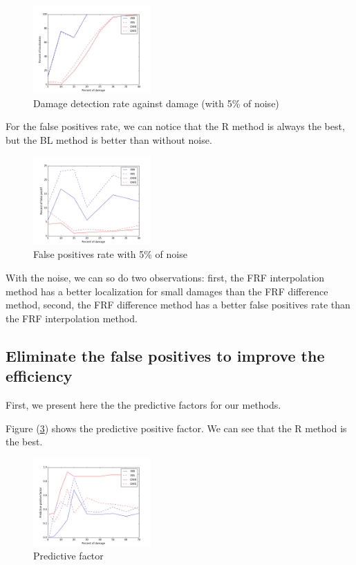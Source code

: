 \documentclass[journal]{IEEEtran}
\begin{document}
\begin{figure}[h!]
  \centering
  \includegraphics[width=0.4\textwidth]{images/detect_noise004.png}
  \caption{Damage detection rate against damage (with 5\% of noise)}
  \label{detect_noise}
\end{figure}

For the false positives rate, we can notice that the R method is always the best, but the BL method is better than without noise.


\begin{figure}[h!]
  \centering
  \includegraphics[width=0.4\textwidth]{images/fp004.png}
  \caption{False positives rate with 5\% of noise}
  \label{fp_noise}
\end{figure}


With the noise, we can so do two observations: first, the FRF interpolation method has a better localization for small damages than the FRF difference method, second,  the FRF difference method has a better false positives rate than the FRF interpolation method.


\subsection{Eliminate the false positives to improve the efficiency}

First, we present here the the predictive factors for our methods.

Figure (\ref{pred}) shows the predictive positive factor. We can see that the R method is the best.

\begin{figure}[h!]
  \centering
  \includegraphics[width=0.4\textwidth]{images/pred.png}
  \caption{Predictive factor}
  \label{pred}
\end{figure}
\end{document}
